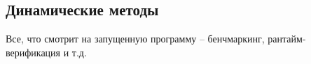 \subsection{Динамические методы}

Все, что смотрит на запущенную программу -- бенчмаркинг, рантайм-верификация и т.д.
